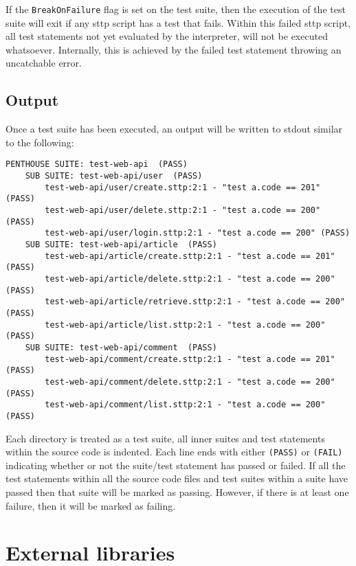 If the \verb|BreakOnFailure| flag is set on the test suite, then the execution of the test suite will exit if any sttp script has a test that fails. Within this failed sttp script, all test statements not yet evaluated by the interpreter, will not be executed whatsoever. Internally, this is achieved by the failed test statement throwing an uncatchable error.

\subsection{Output}
\label{sec:test-suites-and-the-test-statement-test-suite-output}

Once a test suite has been executed, an output will be written to stdout similar to the following:

\begin{verbatim}
PENTHOUSE SUITE: test-web-api  (PASS)
    SUB SUITE: test-web-api/user  (PASS)
        test-web-api/user/create.sttp:2:1 - "test a.code == 201" (PASS)
        test-web-api/user/delete.sttp:2:1 - "test a.code == 200" (PASS)
        test-web-api/user/login.sttp:2:1 - "test a.code == 200" (PASS)
    SUB SUITE: test-web-api/article  (PASS)
        test-web-api/article/create.sttp:2:1 - "test a.code == 201" (PASS)
        test-web-api/article/delete.sttp:2:1 - "test a.code == 200" (PASS)
        test-web-api/article/retrieve.sttp:2:1 - "test a.code == 200" (PASS)
        test-web-api/article/list.sttp:2:1 - "test a.code == 200" (PASS)
    SUB SUITE: test-web-api/comment  (PASS)
        test-web-api/comment/create.sttp:2:1 - "test a.code == 201" (PASS)
        test-web-api/comment/delete.sttp:2:1 - "test a.code == 200" (PASS)
        test-web-api/comment/list.sttp:2:1 - "test a.code == 200" (PASS)
\end{verbatim}

Each directory is treated as a test suite, all inner suites and test statements within the source code is indented. Each line ends with either \verb|(PASS)| or \verb|(FAIL)| indicating whether or not the suite/test statement has passed or failed. If all the test statements within all the source code files and test suites within a suite have passed then that suite will be marked as passing. However, if there is at least one failure, then it will be marked as failing.

\section{External libraries}


